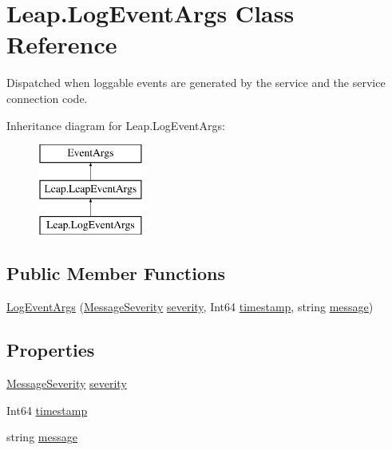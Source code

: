 \hypertarget{class_leap_1_1_log_event_args}{}\section{Leap.\+Log\+Event\+Args Class Reference}
\label{class_leap_1_1_log_event_args}


Dispatched when loggable events are generated by the service and the service connection code.  


Inheritance diagram for Leap.\+Log\+Event\+Args\+:\begin{figure}[H]
\begin{center}
\leavevmode
\includegraphics[height=3.000000cm]{class_leap_1_1_log_event_args}
\end{center}
\end{figure}
\subsection*{Public Member Functions}
\begin{DoxyCompactItemize}
\item 
\mbox{\hyperlink{class_leap_1_1_log_event_args_aed65277dda9fd3ba3ea898e292c5692c}{Log\+Event\+Args}} (\mbox{\hyperlink{namespace_leap_a4341f6495947222d3a86fcbb0c2b629d}{Message\+Severity}} \mbox{\hyperlink{class_leap_1_1_log_event_args_adabdd39dd8a123deae8d437be7464262}{severity}}, Int64 \mbox{\hyperlink{class_leap_1_1_log_event_args_a793248f446f8e35b7f5540ddb673639b}{timestamp}}, string \mbox{\hyperlink{class_leap_1_1_log_event_args_a39cef7faae94aefecf3b70df160c832e}{message}})
\end{DoxyCompactItemize}
\subsection*{Properties}
\begin{DoxyCompactItemize}
\item 
\mbox{\hyperlink{namespace_leap_a4341f6495947222d3a86fcbb0c2b629d}{Message\+Severity}} \mbox{\hyperlink{class_leap_1_1_log_event_args_adabdd39dd8a123deae8d437be7464262}{severity}}
\item 
Int64 \mbox{\hyperlink{class_leap_1_1_log_event_args_a793248f446f8e35b7f5540ddb673639b}{timestamp}}
\item 
string \mbox{\hyperlink{class_leap_1_1_log_event_args_a39cef7faae94aefecf3b70df160c832e}{message}}
\end{DoxyCompactItemize}


